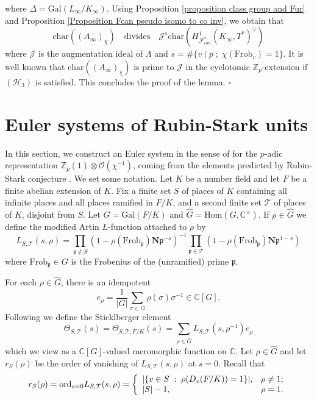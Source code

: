 \documentclass[reqno]{amsart}
\begin{document}
where $\Delta=\mathrm{Gal}(L_{\infty}/K_{\infty})$. Using
Proposition \ref{proposition class group and Fur} and Proposition
\ref{Proposition Fcan pseudo isomo to co inv}, we obtain that
$$
\mathrm{char}((A_{\infty})_{\chi})\quad\mbox{divides}\quad
\mathcal{J}^{s}\mathrm{char}(H^{1}_{\mathcal{F}^{\ast}_{can}}(K_{\infty},T^{\ast})^{\vee})
$$
where $\mathcal{J}$ is the augmentation ideal of $\Lambda$ and
$s=\#\{ v\mid p \;;\; \chi(\mathrm{Frob}_{v})=1  \}$. It is well
known that $\mathrm{char}((A_{\infty})_{\chi})$ is prime to
$\mathcal{J}$ in the cyclotomic $\mathbb{Z}_{p}$-extension if
$(\mathcal{H}_{3})$ is satisfied. This concludes the proof of the
lemma. \hfill $\square$\vskip 6pt
\section{\bf Euler systems of Rubin-Stark units}
In this section, we construct an Euler system in the sense of
\cite[Definition 2.1.1]{Rubin00} for the $p$-adic representation
$\mathbb{Z}_{p}(1)\otimes\mathcal{O}(\chi^{-1})$, coming from the
elements predicted by Rubin-Stark conjecture \cite[Conjecture
$B^{\prime}$]{Rubin96}.\vskip 6pt We set some notation. Let $K$ be a
number field and let $F$ be a finite abelian extension of $K$. Fix a
finite set $S$ of places of $K$ containing all infinite places and
all places ramified in $F/K$, and a second finite set $\mathcal{T}$
of places of $K$, disjoint from $S$. Let $G=\mathrm{Gal}(F/K)$ and
$\widehat{G}=\mathrm{Hom}(G,\mathbb{C}^{\times})$. If $\rho\in
\widehat{G}$ we define the modified Artin $L$-function attached to
$\rho$ by
$$
L_{S,\mathcal{T}}(s,\rho)=\prod_{\mathfrak{p}\not\in
S}(1-\rho(\mathrm{Frob}_{\mathfrak{p}})\mathbf{N}\mathfrak{p}^{-s})^{-1}
\prod_{\mathfrak{p}\in
\mathcal{T}}(1-\rho(\mathrm{Frob}_{\mathfrak{p}})\mathbf{N}\mathfrak{p}^{1-s})
$$
where $\mathrm{Frob}_{\mathfrak{p}}\in G$ is the Frobenius of the
(unramified) prime $\mathfrak{p}$.\par For each $\rho\in
\widehat{G}$, there is an idempotent
$$
e_{\rho}=\frac{1}{|G|}\sum_{\sigma\in G}\rho(\sigma)\sigma^{-1}\in
\mathbb{C}[G].
$$
Following \cite{Tate84} we define the Sticklberger element
$$
\Theta_{S,\mathcal{T}}(s)=\Theta_{S,\mathcal{T},F/K}(s)=\sum_{\rho\in\widehat{G}}L_{S,\mathcal{T}}(s,\rho^{-1})e_{\rho}
$$
which we view as a $\mathbb{C}[G]$-valued meromorphic function on
$\mathbb{C}$.
  Let $\rho\in \widehat{G}$ and let
$r_{S}(\rho)$ be  the order of vanishing of
$L_{S,\mathcal{T}}(s,\rho)$ at $s=0$. Recall that
$$
r_{S}(\rho)=\mathrm{ord}_{s=0}L_{S,\mathcal{T}}(s,\rho)=\left\{
                                              \begin{array}{ll}
                                                |\{v\in S\;:\; \rho(D_{v}(F/K))=1\}|, & \hbox{$\rho\neq 1$;} \\
                                                |S|-1, & \hbox{$\rho=1$.}
                                              \end{array}
                                            \right.
$$
\end{document}

